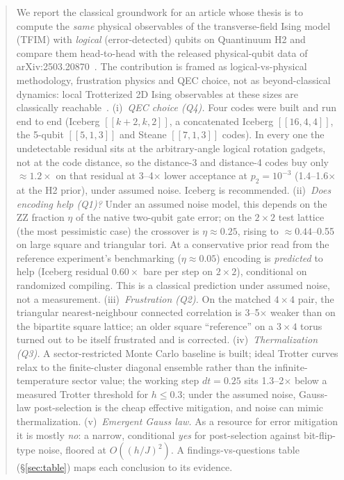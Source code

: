 \documentclass[11pt,a4paper]{article}
\begin{document}
\begin{abstract}
We report the classical groundwork for an article whose thesis is to compute the \emph{same} physical
observables of the transverse-field Ising model (TFIM) with \emph{logical} (error-detected) qubits on
Quantinuum H2 and compare them head-to-head with the released physical-qubit data of
arXiv:2503.20870~\cite{haghshenas}. The contribution is framed as logical-vs-physical methodology,
frustration physics and QEC choice, not as beyond-classical dynamics: local Trotterized 2D Ising observables
at these sizes are classically reachable~\cite{begusic}.
(i)~\emph{QEC choice (Q4).} Four codes were built and run end to end (Iceberg $[[k{+}2,k,2]]$, a concatenated
Iceberg $[[16,4,4]]$, the 5-qubit $[[5,1,3]]$ and Steane $[[7,1,3]]$ codes). In every one the undetectable residual
sits at the arbitrary-angle logical rotation gadgets, not at the code distance, so the distance-3 and distance-4
codes buy only $\approx1.2\times$ on that residual at 3--4$\times$ lower acceptance at $p_2=10^{-3}$ (1.4--1.6$\times$ at
the H2 prior), under assumed noise. Iceberg is recommended.
(ii)~\emph{Does encoding help (Q1)?} Under an assumed noise model, this depends on the ZZ fraction $\eta$ of the
native two-qubit gate error; on the $2\times2$ test lattice (the most pessimistic case) the crossover is
$\eta\approx0.25$, rising to $\approx0.44$--0.55 on large square and triangular tori. At a conservative prior read from
the reference experiment's benchmarking ($\eta\approx0.05$) encoding is \emph{predicted} to help (Iceberg residual
$0.60\times$ bare per step on $2\times2$), conditional on randomized compiling. This is a classical prediction under
assumed noise, not a measurement.
(iii)~\emph{Frustration (Q2).} On the matched $4\times4$ pair, the triangular nearest-neighbour connected
correlation is 3--5$\times$ weaker than on the bipartite square lattice; an older square ``reference'' on a
$3\times4$ torus turned out to be itself frustrated and is corrected.
(iv)~\emph{Thermalization (Q3).} A sector-restricted Monte Carlo baseline is built; ideal Trotter curves relax
to the finite-cluster diagonal ensemble rather than the infinite-temperature sector value; the working step
$dt=0.25$ sits 1.3--2$\times$ below a measured Trotter threshold for $h\le0.3$; under the assumed noise,
Gauss-law post-selection is the cheap effective mitigation, and noise can mimic thermalization.
(v)~\emph{Emergent Gauss law.} As a resource for error mitigation it is mostly \emph{no}: a narrow,
conditional \emph{yes} for post-selection against bit-flip-type noise, floored at $O((h/J)^2)$.
A findings-vs-questions table (\S\ref{sec:table}) maps each conclusion to its evidence.
\end{abstract}
\end{document}
